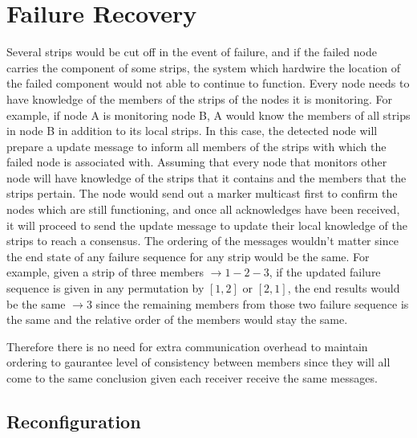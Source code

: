 \section{Failure Recovery}
\label{s:fr}

Several strips would be cut off in the event of failure, and if the
failed node carries the component of some strips, the system which hardwire
the location of the failed component would not able to continue to function. 
Every node needs to have knowledge of the members of the strips of the nodes it
is monitoring. For example, if node A is monitoring node B, A would know the
members of all strips in node B in addition to its local strips.
In this case, the detected node will prepare a update message to inform all
members of the strips with which the failed node is associated with. Assuming
that every node that monitors other node will have knowledge of the strips that
it contains and the members that the strips pertain. The node would send out
a marker multicast first to confirm the nodes which are still functioning, and
once all acknowledges have been received, it will proceed to send the update
message to update their local knowledge of the strips to reach a consensus. The
ordering of the messages wouldn't matter since the end state of any failure
sequence for any strip would be the same. For example, given a strip of three
members $\rightarrow 1-2-3$, if the updated failure sequence is given in any
permutation by $[1, 2]$ or $[2, 1]$, the end results would be the same
$\rightarrow 3$ since the remaining members from those two failure sequence is
the same and the relative order of the members would stay the same.

Therefore there is no need for extra communication overhead to maintain
ordering to gaurantee level of consistency between members since they will all
come to the same conclusion given each receiver receive the same messages.


\subsection{Reconfiguration}
\label{s:reconfig}

